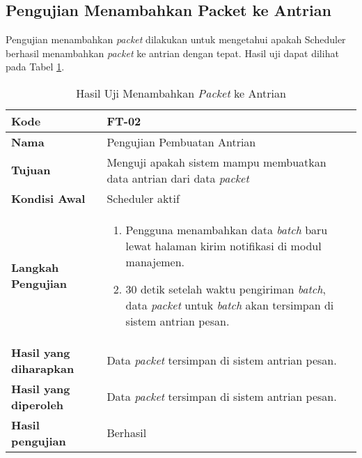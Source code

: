 \subsection{Pengujian Menambahkan Packet ke Antrian}
\par Pengujian menambahkan \textit{packet} dilakukan untuk mengetahui apakah Scheduler berhasil menambahkan \textit{packet} ke antrian dengan tepat. Hasil uji dapat dilihat pada Tabel \ref{t:uji_pembuatan_antrian}.
\begin{longtable}{|p{3cm}|p{6.5cm}|}
	\caption{Hasil Uji Menambahkan \textit{Packet} ke Antrian} \label{t:uji_pembuatan_antrian} \\ \hline
	\textbf{Kode} & FT-02 \\ \hline
	\textbf{Nama} & Pengujian Pembuatan Antrian \\ \hline
	\textbf{Tujuan} & Menguji apakah sistem mampu membuatkan data antrian dari data \textit{packet} \\ \hline
	\textbf{Kondisi Awal} & Scheduler aktif \\ \hline
	\textbf{Langkah Pengujian} &  
	\begin{enumerate}
		\item Pengguna menambahkan data \textit{batch} baru lewat halaman kirim notifikasi di modul manajemen.
		\item 30 detik setelah waktu pengiriman \textit{batch}, data \textit{packet} untuk \textit{batch} akan tersimpan di sistem antrian pesan.
	\end{enumerate} \\ \hline
	\textbf{Hasil yang diharapkan} & Data \textit{packet} tersimpan di sistem antrian pesan. \\ \hline
	\textbf{Hasil yang diperoleh} & Data \textit{packet} tersimpan di sistem antrian pesan. \\ \hline
	\textbf{Hasil pengujian} & Berhasil \\ \hline
\end{longtable}

